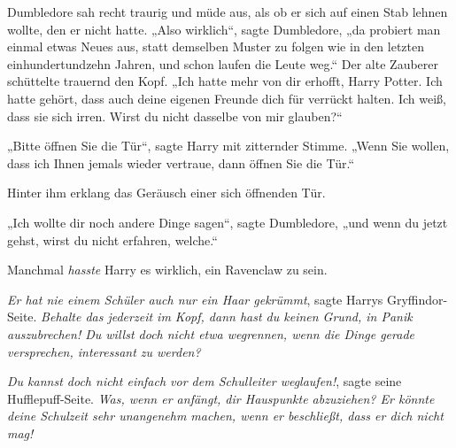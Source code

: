 Dumbledore sah recht traurig und müde aus, als ob er sich auf einen Stab lehnen wollte, den er nicht hatte.
„Also wirklich“, sagte Dumbledore, „da probiert man einmal etwas Neues aus, statt demselben Muster zu folgen wie in den letzten einhundertundzehn Jahren, und schon laufen die Leute weg.“ Der alte Zauberer schüttelte trauernd den Kopf.
„Ich hatte mehr von dir erhofft, Harry Potter. Ich hatte gehört, dass auch deine eigenen Freunde dich für verrückt halten. Ich weiß, dass sie sich irren. Wirst du nicht dasselbe von mir glauben?“

„Bitte öffnen Sie die Tür“, sagte Harry mit zitternder Stimme.
„Wenn Sie wollen, dass ich Ihnen jemals wieder vertraue, dann öffnen Sie die Tür.“

Hinter ihm erklang das Geräusch einer sich öffnenden Tür.

„Ich wollte dir noch andere Dinge sagen“, sagte Dumbledore, „und wenn du jetzt gehst, wirst du nicht erfahren, welche.“

Manchmal \emph{hasste} Harry es wirklich, ein Ravenclaw zu sein.

\emph{Er hat nie einem Schüler auch nur ein Haar gekrümmt}, sagte Harrys Gryffindor-Seite. \emph{Behalte das jederzeit im Kopf, dann hast du keinen Grund, in Panik auszubrechen! Du willst doch nicht etwa wegrennen, wenn die Dinge gerade versprechen, interessant zu werden?}

\emph{Du kannst doch nicht einfach vor dem Schulleiter weglaufen!}, sagte seine Hufflepuff-Seite. \emph{Was, wenn er anfängt, dir Hauspunkte abzuziehen? Er könnte deine Schulzeit sehr unangenehm machen, wenn er beschließt, dass er dich nicht mag!}

